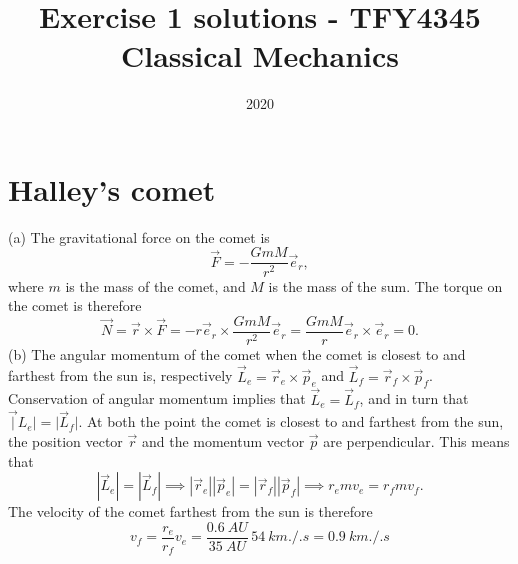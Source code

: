 \documentclass{article}
\title{Exercise 1 solutions - TFY4345 Classical Mechanics}
\date{2020}
\begin{document}
    \maketitle
    \section{Halley's comet}
        (a) The gravitational force on the comet is
        \begin{equation*}
            \vec F = - \frac{GmM}{r^2} \vec e_r,
        \end{equation*}
        where $m$ is the mass of the comet, and $M$ is the mass of the sum. The torque on the comet is therefore
        \begin{equation*}
            \vec N = \vec r \times \vec F = - r \vec e_r \times \frac{GmM}{r^2} \vec e_r = \frac{GmM}{r} \vec e_r \times \vec e_r = 0. 
        \end{equation*}
        (b) The angular momentum of the comet when the comet is closest to and farthest from the sun is, respectively $\vec L_e = \vec r_e \times \vec p_e$ and $\vec L_f = \vec r_f \times \vec p_f$. Conservation of angular momentum implies that $\vec L_e = \vec L_f$, and in turn that $\vec |L_e| = |\vec L_f|$. At both the point the comet is closest to and farthest from the sun, the position vector $\vec r$ and the momentum vector $\vec p$ are perpendicular. This means that
        \begin{equation*}
            |\vec L_e| = |\vec L_f| \implies |\vec r_e || \vec p_e| = |\vec r_f || \vec p_f| \implies r_e m v_e = r_f m v_f.
        \end{equation*}
        The velocity of the comet farthest from the sun is therefore
        \begin{equation*}
            v_f = \frac{r_e}{r_f} v_e = \frac{\SI{0.6}{AU}}{\SI{35}{AU}} \, \SI{54}{km.\per.s} = \SI{0.9}{km.\per.s} 
        \end{equation*}
\end{document}
